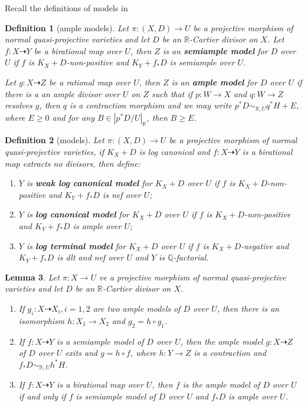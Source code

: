 \documentclass{article}
\newtheorem{defn}{Definition}[subsection]
\newtheorem{lem}[defn]{Lemma}
\begin{document}
Recall the definitions of models in \cite{birkarExistenceMinimalModels2009}
\begin{defn}[ample models]
  Let $ \pi:(X,D)\to U $ be a projective morphism of normal quasi-projective varieties and let $D$ be an $\mathbb{R}$-Cartier divisor on $X$. Let $ f:X\dashrightarrow Y $ be a birational map over $ U $, then $ Z $ is an \textbf{semiample model } for $ D $ over $ U $ if $ f $ is $ K_X+D $-non-positive and $ K_Y+f_*D $ is semiample over $ U $.

  Let $ g:X\dashrightarrow Z $ be a rational map over $ U $, then $ Z $ is an \textbf{ample model } for $ D $ over $ U $ if there is a an ample divisor over $U$  on $Z$  such that if $p:W \to X $ and $q:W \to Z $ resolves $g$, then $q$ is a contraction morphism and we may write $p^*D \sim_{\mathbb{R},U} q^*H+E$, where $E\geqslant 0$ and for any $B \in |p^*D/U|_{\mathbb{R}}$, then $B\geqslant E$.
\end{defn}
\begin{defn}[models]\label{models}
  Let $ \pi:(X,D)\to U $ be a projective morphism of normal quasi-projective varieties, if $ K_X+D $ is log canonical and $ f:X\dashrightarrow Y $ is a birational map extracts no divisors, then define:
  \begin{enumerate}
    \item $ Y $ is \textbf{weak log canonical model} for $ K_X+D $ over $ U $ if $ f $ is $ K_X+D $-non-positive and $ K_Y+f_*D $ is nef over $ U $;
    \item $ Y $ is \textbf{ log canonical model} for $ K_X+D $ over $ U $ if $ f $ is $ K_X+D $-non-positive and $ K_Y+f_*D $ is ample over $ U $;
    \item $ Y $ is \textbf{ log terminal model} for $ K_X+D $ over $ U $ if $ f $ is $ K_X+D $-negative and $ K_Y+f_*D $ is dlt and nef over $ U $ and $ Y $ is $ \mathbb{Q} $-factorial.
  \end{enumerate}
\end{defn}
\begin{lem}\cite[Lemma 3.6.6]{birkarExistenceMinimalModels2009}
  Let $\pi:X \to U$ ve a projective morphism of normal quasi-projective varieties and let $D$ be an $\mathbb{R}$-Cartier divisor on $X$.
  \begin{enumerate}
    \item If $g_{i}:X \dashrightarrow X_{i},i=1,2$ are two ample models of $D$ over $U$, then there is an isomorphism $h:X_{1}\to X_{2}$ and $g_{2}=h \circ g_{1}$.
    \item If $f:X \dashrightarrow Y$ is a semiample model of $D$ over $U$, then the ample model $g:X \dashrightarrow  Z$ of              $D$ over $U$    exits and $g=h \circ f$, where $h:Y \to Z$ is a contraction and $f_*D \sim_{\mathbb{R},U}h^*H$.
  \item  If $f:X \dashrightarrow Y$ is a birational map over $U$, then $f$ is the ample model of $D$ over $U$ if and only if $f$ is semiample model of $D$ over $U$ and $f_*D$ is ample over $U$.     
  \end{enumerate}
\end{lem}
\end{document}
